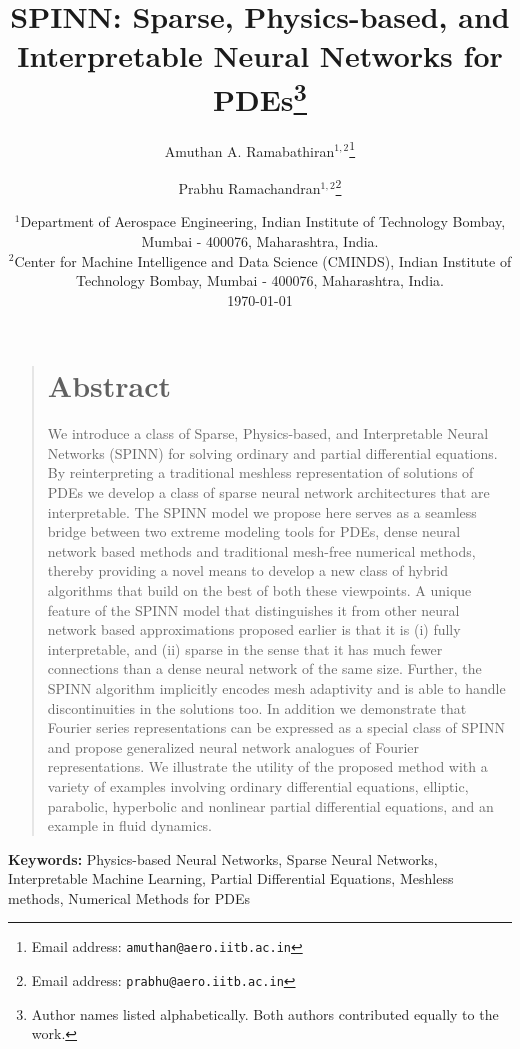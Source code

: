 \documentclass[12pt]{article}
\title{SPINN: Sparse, Physics-based, and Interpretable Neural Networks for PDEs\footnote{Author names listed alphabetically. Both authors contributed equally to the work.}}
\author{\textsf{Amuthan A. Ramabathiran}$^{1,2}$\footnote{Email address: \texttt{amuthan@aero.iitb.ac.in}} \and \textsf{Prabhu Ramachandran}$^{1,2}$\footnote{Email address: \texttt{prabhu@aero.iitb.ac.in}}}
\date{%
	$^1${\small Department of Aerospace Engineering, Indian Institute of Technology Bombay, Mumbai - 400076, Maharashtra, India.}\\[2ex]%
	$^2${\small Center for Machine Intelligence and Data Science (CMINDS), Indian Institute of Technology Bombay, Mumbai - 400076, Maharashtra, India.}\\[2ex]%
	\today
}
\providecommand{\keywords}[1]{\textbf{\textsf{Keywords:}} #1}
\begin{document}
\maketitle

\begin{quote}
\section*{Abstract}
We introduce a class of Sparse, Physics-based, and Interpretable Neural Networks (SPINN) for solving ordinary and partial differential equations. By reinterpreting a traditional meshless representation of solutions of PDEs we develop a class of sparse neural network architectures that are interpretable. The SPINN model we propose here serves as a seamless bridge between two extreme modeling tools for PDEs, dense neural network based methods and traditional mesh-free numerical methods, thereby providing a novel means to develop a new class of hybrid algorithms that build on the best of both these viewpoints. A unique feature of the SPINN model that distinguishes it from other neural network based approximations proposed earlier is that it is (i) fully interpretable, and (ii) sparse in the sense that it has much fewer connections than a dense neural network of the same size. Further, the SPINN algorithm implicitly encodes mesh adaptivity and is able to handle discontinuities in the solutions too. In addition we demonstrate that Fourier series representations can be expressed as a special class of SPINN and propose generalized neural network analogues of Fourier representations. We illustrate the utility of the proposed method with a variety of examples involving ordinary differential equations, elliptic, parabolic, hyperbolic and nonlinear partial differential equations, and an example in fluid dynamics.
\end{quote}


\keywords{Physics-based Neural Networks, Sparse Neural Networks, Interpretable Machine Learning, Partial Differential Equations, Meshless methods, Numerical Methods for PDEs}

\end{document}
